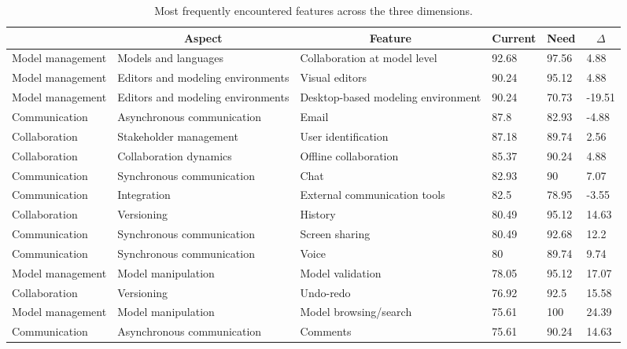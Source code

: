 
  \begin{table*}[]
  \centering
  \notsotiny
  \caption{ Most frequently encountered features across the three dimensions.}
\label{tab:most-frequent}
\begin{tabular}{|l|l|l|l|l|l|}
  \hline
  \rowcolor[HTML]{C0C0C0}
    \multicolumn{1}{|c|}{Dimension} & \multicolumn{1}{c|}{Aspect} & \multicolumn{1}{c|}{Feature} & \multicolumn{1}{c|}{Current} & \multicolumn{1}{c|}{Need} & \multicolumn{1}{c|}{$\Delta$} \\ \hline
    Model management & Models and languages & Collaboration at model level & 92.68 & 97.56 & 4.88 \\ \hline 
Model management & Editors and modeling environments & Visual editors & 90.24 & 95.12 & 4.88 \\ \hline 
Model management & Editors and modeling environments & Desktop-based modeling environment & 90.24 & 70.73 & -19.51 \\ \hline 
Communication & Asynchronous communication & Email & 87.8 & 82.93 & -4.88 \\ \hline 
Collaboration & Stakeholder management & User identification & 87.18 & 89.74 & 2.56 \\ \hline 
Collaboration & Collaboration dynamics & Offline collaboration & 85.37 & 90.24 & 4.88 \\ \hline 
Communication & Synchronous communication & Chat & 82.93 & 90 & 7.07 \\ \hline 
Communication & Integration & External communication tools & 82.5 & 78.95 & -3.55 \\ \hline 
Collaboration & Versioning & History & 80.49 & 95.12 & 14.63 \\ \hline 
Communication & Synchronous communication & Screen sharing & 80.49 & 92.68 & 12.2 \\ \hline 
Communication & Synchronous communication & Voice & 80 & 89.74 & 9.74 \\ \hline 
Model management & Model manipulation & Model validation & 78.05 & 95.12 & 17.07 \\ \hline 
Collaboration & Versioning & Undo-redo & 76.92 & 92.5 & 15.58 \\ \hline 
Model management & Model manipulation & Model browsing/search & 75.61 & 100 & 24.39 \\ \hline 
Communication & Asynchronous communication & Comments & 75.61 & 90.24 & 14.63 \\ \hline 

\end{tabular}
\end{table*}
